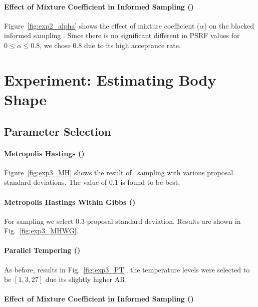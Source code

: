 \paragraph{Effect of Mixture Coefficient in Informed Sampling (\INFBMHWG)}

Figure~\ref{fig:exp2_alpha} shows the effect of mixture
coefficient ($\alpha$) on the blocked informed sampling
\INFBMHWG. Since there is no significant different in PSRF values for
$0 \le \alpha \le 0.8$, we chose $0.8$ due to its high acceptance
rate.



\section{Experiment: Estimating Body Shape}
\label{appendix:chap3:body}

\subsection{Parameter Selection}
\paragraph{Metropolis Hastings (\MH)}



Figure~\ref{fig:exp3_MH} shows the result of \MH~sampling with various
proposal standard deviations. The value of $0.1$ is found to be
best.

\paragraph{Metropolis Hastings Within Gibbs (\MHWG)}

For \MHWG sampling we select $0.3$ proposal standard
deviation. Results are shown in Fig.~\ref{fig:exp3_MHWG}.



\paragraph{Parallel Tempering (\PT)}

As before, results in Fig.~\ref{fig:exp3_PT}, the temperature levels
were selected to be $[1,3,27]$ due its slightly higher AR.

\paragraph{Effect of Mixture Coefficient in Informed Sampling (\MIXLMH)}

